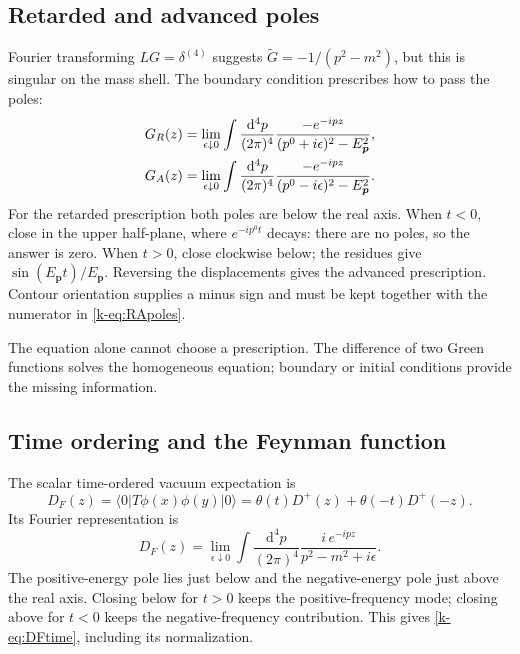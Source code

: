 \documentclass[11pt]{article}
\newcommand{\dd}{\mathrm{d}}
\newcommand{\vac}{\lvert0\rangle}
\newcommand{\vbra}{\langle0\rvert}
\begin{document}
\subsection{Retarded and advanced poles}
Fourier transforming \(LG=\delta^{(4)}\) suggests
\(\widetilde G=-1/(p^2-m^2)\), but this is singular on the mass shell.
The boundary condition prescribes how to pass the poles:
\begin{align}
 G_R(z)&=\lim_{\epsilon\downarrow0}\int\frac{\dd^4p}{(2\pi)^4}
 \frac{-e^{-ipz}}{(p^0+i\epsilon)^2-E_{\bm p}^2},\notag\\
 G_A(z)&=\lim_{\epsilon\downarrow0}\int\frac{\dd^4p}{(2\pi)^4}
 \frac{-e^{-ipz}}{(p^0-i\epsilon)^2-E_{\bm p}^2}.
 \label{k-eq:RApoles}
\end{align}
For the retarded prescription both poles are below the real axis.
When \(t<0\), close in the upper half-plane, where
\(e^{-ip^0t}\) decays: there are no poles, so the answer is zero.
When \(t>0\), close clockwise below; the residues give
\(\sin(E_{\bm p}t)/E_{\bm p}\). Reversing the displacements gives the
advanced prescription. Contour orientation supplies a minus sign and
must be kept together with the numerator in \eqref{k-eq:RApoles}.

The equation alone cannot choose a prescription. The difference of two
Green functions solves the homogeneous equation; boundary or initial
conditions provide the missing information.

\subsection{Time ordering and the Feynman function}
The scalar time-ordered vacuum expectation is
\begin{equation}
 D_F(z)=\vbra T\phi(x)\phi(y)\vac
 =\theta(t)D^+(z)+\theta(-t)D^+(-z).
 \label{k-eq:DFtime}
\end{equation}
Its Fourier representation is
\begin{equation}
 D_F(z)=\lim_{\epsilon\downarrow0}\int\frac{\dd^4p}{(2\pi)^4}
        \frac{i\,e^{-ipz}}{p^2-m^2+i\epsilon}.
 \label{k-eq:DFfourier}
\end{equation}
The positive-energy pole lies just below and the negative-energy pole
just above the real axis. Closing below for \(t>0\) keeps the
positive-frequency mode; closing above for \(t<0\) keeps the
negative-frequency contribution. This gives \eqref{k-eq:DFtime}, including
its normalization.
\end{document}
